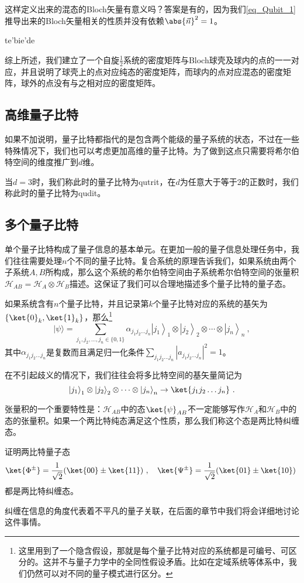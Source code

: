 这样定义出来的混态的Bloch矢量有意义吗？答案是有的，因为我们\autoref{eq_Qubit_1} 推导出来的Bloch矢量相关的性质并没有依赖$\abs{\vec{n}}^2 = 1$。

te'bie'de

综上所述，我们建立了一个自旋$\frac{1}{2}$系统的密度矩阵与Bloch球壳及球内的点的一一对应，并且说明了球壳上的点对应纯态的密度矩阵，而球内的点对应混态的密度矩阵，球外的点没有与之相对应的密度矩阵。



\subsection{高维量子比特}

如果不加说明，量子比特都指代的是包含两个能级的量子系统的状态，不过在一些特殊情况下，我们也可以考虑更加高维的量子比特。为了做到这点只需要将希尔伯特空间的维度推广到$d$维。

当$d=3$时，我们称此时的量子比特为qutrit，在$d$为任意大于等于2的正数时，我们称此时的量子比特为qudit。

\subsection{多个量子比特}


单个量子比特构成了量子信息的基本单元。在更加一般的量子信息处理任务中，我们往往需要处理$n$个不同的量子比特。复合系统的原理告诉我们，如果系统由两个子系统$A,B$所构成，那么这个系统的希尔伯特空间由子系统希尔伯特空间的张量积$\mathcal{H}_{AB}=\mathcal{H}_A\otimes\mathcal{H}_B$描述。这保证了我们可以合理地描述多个量子比特的量子态。

如果系统含有$n$个量子比特，并且记录第$k$个量子比特对应的系统的基矢为$\{\ket{0}_k,\ket{1}_k\}$，那么\footnote{这里用到了一个隐含假设，那就是每个量子比特对应的系统都是可编号、可区分的。这并不与量子力学中的全同性假设矛盾。比如在定域系统等体系中，我们仍然可以对不同的量子模式进行区分。}$$
|\psi\rangle=\sum_{j_1, j_2, \ldots, j_n \in\{0,1\}} \alpha_{j_1 j_2 \ldots j_n}\left|j_1\right\rangle_1 \otimes\left|j_2\right\rangle_2 \otimes \cdots \otimes\left|j_n\right\rangle_n~,
$$其中$\alpha_{j_1j_2\ldots j_n}$是复数而且满足归一化条件$\sum_{j_1j_2\ldots j_n}|a_{j_1j_2\ldots j_n}|^2=1$。

在不引起歧义的情况下，我们往往会将多比特空间的基矢量简记为$$\left|j_1\right\rangle_1 \otimes\left|j_2\right\rangle_2 \otimes \cdots \otimes\left|j_n\right\rangle_n\to \ket{j_1j_2\ldots j_n}~. $$

张量积的一个重要特性是：$\mathcal{H}_{AB}$中的态$\ket{\psi}_{AB}$不一定能够写作$\mathcal{H}_A$和$\mathcal{H}_B$中的态的张量积。如果一个两比特纯态满足这个性质，那么我们称这个态是两比特纠缠态。
\begin{exercise}{}
证明两比特量子态$$\ket{\Phi^{\pm}}=\frac{1}{\sqrt{2}}(\ket{00}\pm\ket{11})~,\quad \ket{\Psi^{\pm}}=\frac{1}{\sqrt{2}}(\ket{01}\pm\ket{10})~$$
都是两比特纠缠态。
\end{exercise}

纠缠在信息的角度代表着不平凡的量子关联，在后面的章节中我们将会详细地讨论这件事情。
